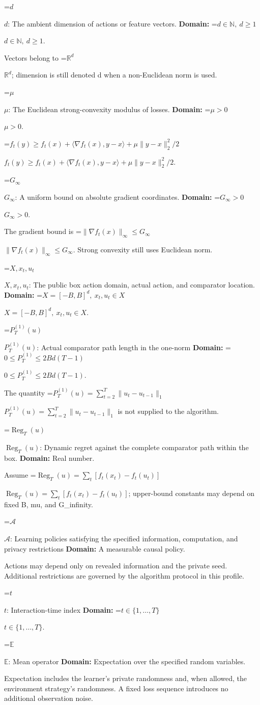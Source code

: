 \documentclass[10pt,a4paper]{article}
\newcommand{\AtlasMath}[1]{\par\begingroup\centering\setbox0=\hbox{$\displaystyle #1$}\ifdim\wd0>1.4\linewidth\typeout{ATLAS WIDE FORMULA: \the\wd0}\fi\ifdim\wd0>\linewidth\resizebox{\linewidth}{!}{\box0}\else\box0\fi\par\endgroup}
\newcommand{\AtlasInlineMath}[1]{\begingroup\setbox0=\hbox{$#1$}\ifdim\wd0>.4\linewidth\endgroup\AtlasMath{#1}\else\endgroup$#1$\fi}
\begin{document}
\AtlasInlineMath{d}: The ambient dimension of actions or feature vectors. \textbf{Domain:} \AtlasInlineMath{d\in\mathbb N,\ d\ge1}.

Vectors belong to \AtlasInlineMath{\mathbb R^d}; dimension is still denoted d when a non-Euclidean norm is used.

\AtlasInlineMath{\mu}: The Euclidean strong-convexity modulus of losses. \textbf{Domain:} \AtlasInlineMath{\mu>0}.

\AtlasInlineMath{f_t(y)\ge f_t(x)+\langle\nabla f_t(x),y-x\rangle+\mu\|y-x\|_2^2/2}.

\AtlasInlineMath{G_\infty}: A uniform bound on absolute gradient coordinates. \textbf{Domain:} \AtlasInlineMath{G_\infty>0}.

The gradient bound is \AtlasInlineMath{\|\nabla f_t(x)\|_\infty\le G_\infty}. Strong convexity still uses Euclidean norm.

\AtlasInlineMath{X,x_t,u_t}: The public box action domain, actual action, and comparator location. \textbf{Domain:} \AtlasInlineMath{X=[-B,B]^d,\ x_t,u_t\in X}.

\AtlasInlineMath{P_T^{(1)}(u)}: Actual comparator path length in the one-norm \textbf{Domain:} \AtlasInlineMath{0\le P_T^{(1)}\le2Bd(T-1)}.

The quantity \AtlasInlineMath{P_T^{(1)}(u)=\sum_{t=2}^T\|u_t-u_{t-1}\|_1} is not supplied to the algorithm.

\AtlasInlineMath{\operatorname{Reg}_T(u)}: Dynamic regret against the complete comparator path within the box. \textbf{Domain:} Real number.

Assume \AtlasInlineMath{\operatorname{Reg}_T(u)=\sum_t[f_t(x_t)-f_t(u_t)]}; upper-bound constants may depend on fixed B, mu, and G\_infinity.

\AtlasInlineMath{\mathcal A}: Learning policies satisfying the specified information, computation, and privacy restrictions \textbf{Domain:} A measurable causal policy.

Actions may depend only on revealed information and the private seed. Additional restrictions are governed by the algorithm protocol in this profile.

\AtlasInlineMath{t}: Interaction-time index \textbf{Domain:} \AtlasInlineMath{t\in\{1,\ldots,T\}}.

\AtlasInlineMath{\mathbb E}: Mean operator \textbf{Domain:} Expectation over the specified random variables.

Expectation includes the learner's private randomness and, when allowed, the environment strategy's randomness. A fixed loss sequence introduces no additional observation noise.
\end{document}
